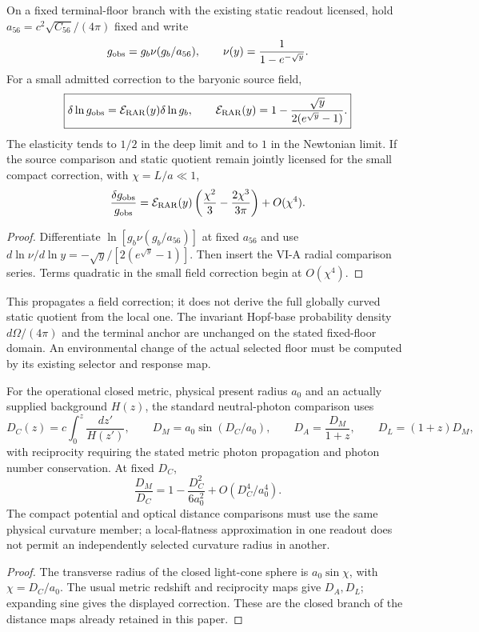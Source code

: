 \documentclass[12pt,a4paper]{article}
\begin{document}
\begin{corollary}
\label{p9:cor:v2204-rar-propagation-elasticity}
On a fixed terminal-floor branch with the existing static readout licensed,
hold $a_{56}=c^2\sqrt{C_{56}}/(4\pi)$ fixed and write
\[
 g_{\rm obs}=g_b\nu(g_b/a_{56}),\qquad
 \nu(y)=\frac1{1-e^{-\sqrt y}}.
\]
For a small admitted correction to the baryonic source field,
\begin{equation}
\label{p9:eq:v2204-rar-elasticity}
 \boxed{\delta\ln g_{\rm obs}
 =\mathcal E_{\rm RAR}(y)\delta\ln g_b,\qquad
 \mathcal E_{\rm RAR}(y)
 =1-\frac{\sqrt y}{2(e^{\sqrt y}-1)}.}
\end{equation}
The elasticity tends to $1/2$ in the deep limit and to $1$ in the Newtonian
limit. If the source comparison and static quotient remain jointly licensed
for the small compact correction, with $\chi=L/a\ll1$,
\[
 \frac{\delta g_{\rm obs}}{g_{\rm obs}}
 =\mathcal E_{\rm RAR}(y)
   \left(\frac{\chi^2}{3}-\frac{2\chi^3}{3\pi}\right)+O(\chi^4).
\]
\end{corollary}
\begin{proof}
Differentiate $\ln[g_b\nu(g_b/a_{56})]$ at fixed $a_{56}$ and use
$d\ln\nu/d\ln y=-\sqrt y/[2(e^{\sqrt y}-1)]$. Then insert the VI-A radial
comparison series. Terms quadratic in the small field correction begin at
$O(\chi^4)$.
\end{proof}
This propagates a field correction; it does not derive the full globally
curved static quotient from the local one. The invariant Hopf-base
probability density $d\Omega/(4\pi)$ and the terminal anchor are unchanged
on the stated fixed-floor domain. An environmental change of the actual
selected floor must be computed by its existing selector and response map.

\begin{proposition}
\label{p9:prop:v2204-curvature-distance-consistency}
For the operational closed metric, physical present radius $a_0$ and an
actually supplied background $H(z)$, the standard neutral-photon comparison
uses
\[
 D_C(z)=c\int_0^z\frac{dz'}{H(z')},\qquad
 D_M=a_0\sin(D_C/a_0),\qquad
 D_A=\frac{D_M}{1+z},\qquad D_L=(1+z)D_M,
\]
with reciprocity requiring the stated metric photon propagation and photon
number conservation. At fixed $D_C$,
\[
 \frac{D_M}{D_C}=1-\frac{D_C^2}{6a_0^2}+O(D_C^4/a_0^4).
\]
The compact potential and optical distance comparisons must use the same
physical curvature member; a local-flatness approximation in one readout
does not permit an independently selected curvature radius in another.
\end{proposition}
\begin{proof}
The transverse radius of the closed light-cone sphere is $a_0\sin\chi$,
with $\chi=D_C/a_0$. The usual metric redshift and reciprocity maps give
$D_A,D_L$; expanding sine gives the displayed correction. These are the
closed branch of the distance maps already retained in this paper.
\end{proof}
\end{document}
